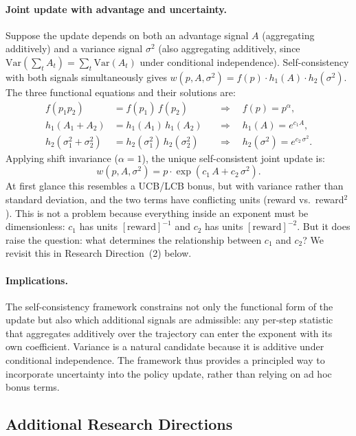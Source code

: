 \documentclass[11pt]{article}
\theoremstyle{definition}
\theoremstyle{remark}
\newcommand{\Var}{\mathrm{Var}}
\begin{document}
\paragraph{Joint update with advantage and uncertainty.}
Suppose the update depends on both an advantage signal $A$ (aggregating additively) and a variance signal $\sigma^2$ (also aggregating additively, since $\Var(\sum_t A_t) = \sum_t \Var(A_t)$ under conditional independence). Self-consistency with both signals simultaneously gives $w(p, A, \sigma^2) = f(p) \cdot h_1(A) \cdot h_2(\sigma^2)$. The three functional equations and their solutions are:
\begin{align*}
  f(p_1 p_2) &= f(p_1)\,f(p_2) &&\Longrightarrow\quad f(p) = p^\alpha, \\
  h_1(A_1 + A_2) &= h_1(A_1)\,h_1(A_2) &&\Longrightarrow\quad h_1(A) = e^{c_1 A}, \\
  h_2(\sigma_1^2 + \sigma_2^2) &= h_2(\sigma_1^2)\,h_2(\sigma_2^2) &&\Longrightarrow\quad h_2(\sigma^2) = e^{c_2\,\sigma^2}.
\end{align*}
Applying shift invariance ($\alpha = 1$), the unique self-consistent joint update is:
\begin{equation}\label{eq:joint-update}
  w(p, A, \sigma^2) = p \cdot \exp\!\left(c_1\, A + c_2\,\sigma^2\right).
\end{equation}
At first glance this resembles a UCB/LCB bonus, but with variance rather than standard deviation, and the two terms have conflicting units (reward vs.\ reward$^2$). This is not a problem because everything inside an exponent must be dimensionless: $c_1$ has units $[\text{reward}]^{-1}$ and $c_2$ has units $[\text{reward}]^{-2}$. But it does raise the question: what determines the relationship between $c_1$ and $c_2$? We revisit this in Research Direction~(2) below.

\paragraph{Implications.}
The self-consistency framework constrains not only the functional form of the update but also which additional signals are admissible: any per-step statistic that aggregates additively over the trajectory can enter the exponent with its own coefficient. Variance is a natural candidate because it is additive under conditional independence. The framework thus provides a principled way to incorporate uncertainty into the policy update, rather than relying on ad hoc bonus terms.

\subsection{Additional Research Directions}
\end{document}
